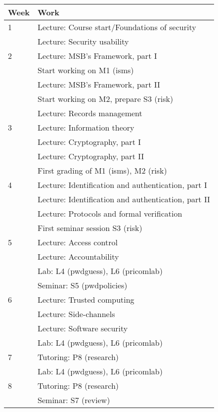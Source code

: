 \begin{table}
	\centering
  \begin{tabular}{lp{9cm}}
    \toprule
    \textbf{Week}	& \textbf{Work} \\
    \midrule
    1
    & Lecture: Course start/Foundations of security\\
    & Lecture: Security usability\\
    \midrule
    2
    & Lecture: MSB's Framework, part I\\
    & Start working on M1 (isms)\\
    & Lecture: MSB's Framework, part II\\
    & Start working on M2, prepare S3 (risk)\\
    & Lecture: Records management\\
    \midrule
    3
    & Lecture: Information theory\\
    & Lecture: Cryptography, part I\\
    & Lecture: Cryptography, part II\\
    & First grading of M1 (isms), M2 (risk)\\
    \midrule
    4
    & Lecture: Identification and authentication, part I\\
    & Lecture: Identification and authentication, part II\\
    & Lecture: Protocols and formal verification\\
    & First seminar session S3 (risk)\\
    \midrule
    5
    & Lecture: Access control\\
    & Lecture: Accountability\\
    & Lab: L4 (pwdguess), L6 (pricomlab)\\
    & Seminar: S5 (pwdpolicies)\\
    \midrule
    6
    & Lecture: Trusted computing\\
    & Lecture: Side-channels\\
    & Lecture: Software security\\
    & Lab: L4 (pwdguess), L6 (pricomlab)\\
    \midrule
    7
    & Tutoring: P8 (research)\\
    & Lab: L4 (pwdguess), L6 (pricomlab)\\
    \midrule
    8
    & Tutoring: P8 (research)\\
    & Seminar: S7 (review)\\

\end{tabular}
\end{table}
